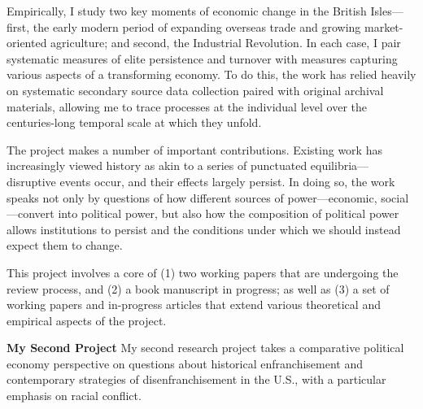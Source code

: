 \documentclass[11pt]{article}
\begin{document}
Empirically, I study two key moments of economic change in the British Isles---first, the early modern period of expanding overseas trade and growing market-oriented agriculture; and second, the Industrial Revolution.  In each case, I pair systematic measures of elite persistence and turnover with measures capturing various aspects of a transforming economy.  To do this, the work has relied heavily on systematic secondary source data collection paired with original archival materials, allowing me to trace processes at the individual level over the centuries-long temporal scale at which they unfold.  

The project makes a number of important contributions.  Existing work has increasingly viewed history as akin to a series of punctuated equilibria---disruptive events occur, and their effects largely persist.  In doing so, the work speaks not only by questions of how different sources of power---economic, social---convert into political power, but also how the composition of political power allows institutions to persist and the conditions under which we should instead expect them to change.


This project involves a core of (1) two working papers that are undergoing the review process, and (2) a book manuscript in progress; as well as (3) a set of working papers and in-progress articles that extend various theoretical and empirical aspects of the project.

\vspace*{.02in}
\textbf{My Second Project} \hspace*{.12in}   My second research project takes a comparative political economy perspective on questions about historical enfranchisement and contemporary strategies of disenfranchisement in the U.S., with a particular emphasis on racial conflict.
\end{document}
